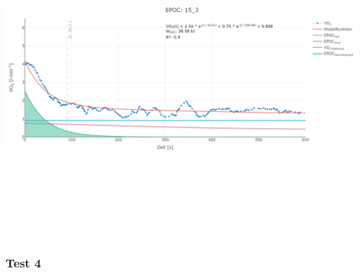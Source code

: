 \documentclass[
  letterpaper,
  DIV=11]{scrartcl}
\begin{document}
\includegraphics[width=11.45833in,height=4.6875in]{images/15_3.png}

\subsubsection{Test 4}
\end{document}
